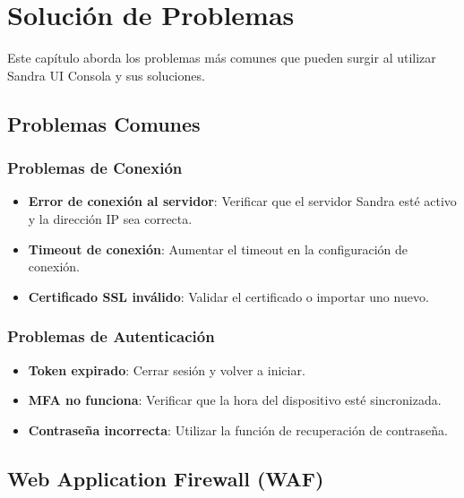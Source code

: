 
\chapter{Solución de Problemas}

Este capítulo aborda los problemas más comunes que pueden surgir al utilizar Sandra UI Consola y sus soluciones.

\section{Problemas Comunes}

\subsection{Problemas de Conexión}

\begin{itemize}
    \item \textbf{Error de conexión al servidor}: Verificar que el servidor Sandra esté activo y la dirección IP sea correcta.
    \item \textbf{Timeout de conexión}: Aumentar el timeout en la configuración de conexión.
    \item \textbf{Certificado SSL inválido}: Validar el certificado o importar uno nuevo.
\end{itemize}

\subsection{Problemas de Autenticación}

\begin{itemize}
    \item \textbf{Token expirado}: Cerrar sesión y volver a iniciar.
    \item \textbf{MFA no funciona}: Verificar que la hora del dispositivo esté sincronizada.
    \item \textbf{Contraseña incorrecta}: Utilizar la función de recuperación de contraseña.
\end{itemize}

\section{Web Application Firewall (WAF)}

